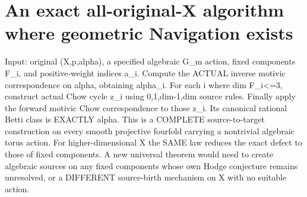 \documentclass[11pt]{article}
\begin{document}
\section{An exact all-original-X algorithm where geometric Navigation exists}
Input: original (X,p,alpha), a specified algebraic
G_m action, fixed components F_i, and positive-weight
indices a_i. Compute the ACTUAL inverse motivic
correspondence on alpha, obtaining alpha_i.
For each i where dim F_i<=3, construct actual Chow
cycle z_i using 0,1,dim-1,dim source rules.
Finally apply the forward motivic Chow correspondence
to those z_i. Its canonical rational Betti class is
EXACTLY alpha.
This is a COMPLETE source-to-target construction
on every smooth projective fourfold carrying
a nontrivial algebraic torus action.
For higher-dimensional X the SAME law reduces
the exact defect to those of fixed components.
A new universal theorem would need to create
algebraic sources on any fixed components whose
own Hodge conjecture remains unresolved,
or a DIFFERENT source-birth mechanism on X
with no suitable action.
\end{document}

